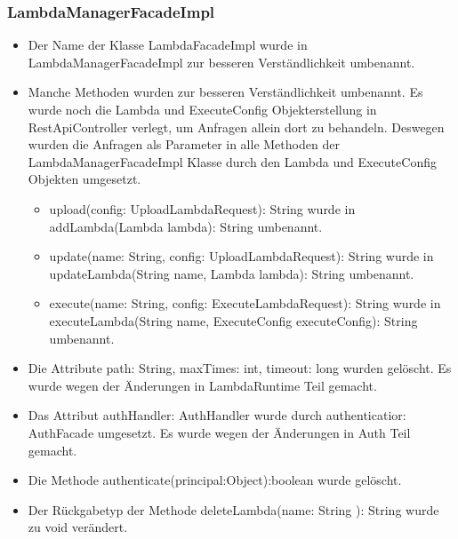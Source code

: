 \documentclass[a4paper,20pt,oneside]{book}
\begin{document}
	\subsubsection{LambdaManagerFacadeImpl}
	\vspace{0.5cm}
	\begin{itemize}
	\item Der Name der Klasse LambdaFacadeImpl wurde in LambdaManagerFacadeImpl zur besseren Verständlichkeit umbenannt. \linebreak
	\item Manche Methoden wurden zur besseren Verständlichkeit umbenannt. Es wurde noch die Lambda und ExecuteConfig Objekterstellung in RestApiController verlegt, um Anfragen allein dort zu behandeln. Deswegen wurden die Anfragen als Parameter in alle Methoden der LambdaManagerFacadeImpl Klasse durch den Lambda und ExecuteConfig Objekten umgesetzt. \linebreak
	\begin{itemize}
	\item   upload(config: UploadLambdaRequest): String  wurde in addLambda(Lambda lambda): String umbenannt.\linebreak
	\item  update(name: String, config: UploadLambdaRequest): String  wurde in updateLambda(String name, Lambda lambda): String umbenannt.\linebreak
	\item   execute(name: String, config: ExecuteLambdaRequest): String  wurde in executeLambda(String name, ExecuteConfig executeConfig): String umbenannt.\linebreak
	
	\end{itemize}
	\item Die Attribute  path: String, maxTimes: int, timeout: long wurden gelöscht. Es wurde wegen der Änderungen in LambdaRuntime Teil gemacht.\linebreak
	\item Das Attribut authHandler: AuthHandler  wurde durch authenticatior: AuthFacade umgesetzt. Es wurde wegen der Änderungen in Auth Teil gemacht. \linebreak
	\item Die Methode authenticate(principal:Object):boolean wurde gelöscht.  
 \linebreak
 \item Der Rückgabetyp der Methode  deleteLambda(name: String ): String  wurde zu void verändert.\linebreak
	\end{itemize}
	
\end{document}
